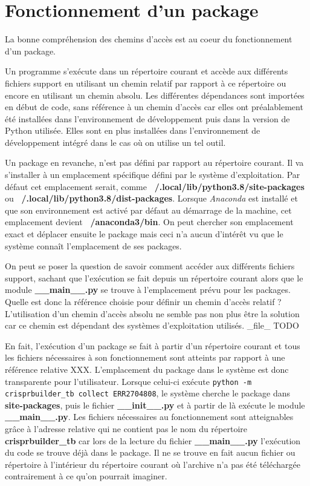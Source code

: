 \documentclass[twoside,a4paper,11pt,frenchb,openany]{report}
\begin{document}
\section{Fonctionnement d'un package}

La bonne compréhension des chemins d'accès est au coeur du fonctionnement d'un package.

Un programme s'exécute dans un répertoire courant et accède aux différents fichiers support en utilisant un chemin relatif par rapport à ce répertoire ou encore en utilisant un chemin absolu. Les différentes dépendances sont importées en début de code, sans référence à un chemin d'accès car elles ont préalablement été installées dans l'environnement de développement puis dans la version de Python utilisée. Elles sont en plus installées dans l'environnement de développement intégré dans le cas où on utilise un tel outil.

Un package en revanche, n'est pas défini par rapport au répertoire courant. Il va s'installer à un emplacement spécifique défini par le système d'exploitation. Par défaut cet emplacement serait, comme \textbf{~/.local/lib/python3.8/site-packages} ou \textbf{~/.local/lib/python3.8/dist-packages}. Lorsque \textit{Anaconda} est installé et que son environnement est activé par défaut au démarrage de la machine, cet emplacement devient \textbf{~/anaconda3/bin}. On peut chercher son emplacement exact et déplacer ensuite le package mais ceci n'a aucun d'intérêt vu que le système connaît l'emplacement de ses packages.

On peut se poser la question de savoir comment accéder aux différents fichiers support, sachant que l'exécution se fait depuis un répertoire courant alors que le module \textbf{\_\_main\_\_.py} se trouve à l'emplacement prévu pour les packages. Quelle est donc la référence choisie pour définir un chemin d'accès relatif ? L'utilisation d'un chemin d'accès absolu ne semble pas non plus être la solution car ce chemin est dépendant des systèmes d'exploitation utilisés. \_file\_ TODO

En fait, l'exécution d'un package se fait à partir d'un répertoire courant et tous les fichiers nécessaires à son fonctionnement sont atteints par rapport à une référence relative XXX. L'emplacement du package dans le système est donc transparente pour l'utilisateur. Lorsque celui-ci exécute \texttt{python -m crisprbuilder\_tb \textemdash \textemdash collect ERR2704808}, le système cherche le package dans \textbf{site-packages}, puis le fichier \textbf{\_\_init\_\_.py} et à partir de là exécute le module \textbf{\_\_main\_\_.py}. Les fichiers nécessaires au fonctionnement sont atteignables grâce à l'adresse relative qui ne contient pas le nom du répertoire \textbf{crisprbuilder\_tb} car lors de la lecture du fichier \textbf{\_\_main\_\_.py} l'exécution du code se trouve déjà dans le package. Il ne se trouve en fait aucun fichier ou répertoire à l'intérieur du répertoire courant où l'archive n'a pas été téléchargée contrairement à ce qu'on pourrait imaginer.
\end{document}
